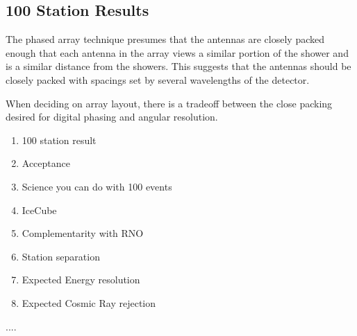\documentclass{PoS}
\begin{document}
\subsection{100 Station Results}


The phased array technique presumes that the antennas are closely packed enough that each antenna in the array views a similar portion of the shower and is a similar distance from the showers. This suggests that the antennas should be closely packed with spacings set by several wavelengths of the detector.

When deciding on array layout, there is a tradeoff between the close packing desired for digital phasing and angular resolution. 


\begin{enumerate}
    \item 100 station result
    \item Acceptance
    \item Science you can do with 100 events
    \item IceCube 
    \item Complementarity with RNO
    \item Station separation
    \item Expected Energy resolution
    \item Expected Cosmic Ray rejection
\end{enumerate}

\begin{thebibliography}{99}
....






\end{thebibliography}
\end{document}
